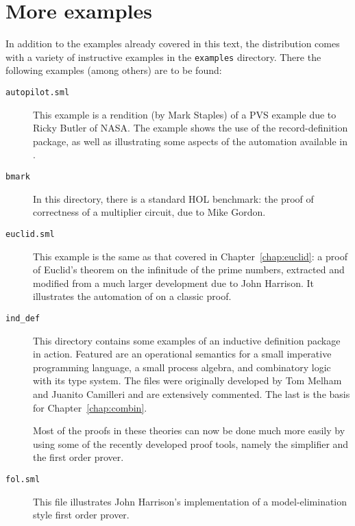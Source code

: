
\chapter{More examples}
\label{chap:more-examples}

In addition to the examples already covered in this text, the \holn{}
distribution comes with a variety of instructive examples in the
\verb|examples| directory.  There the following examples (among
others) are to be found:

\begin{description}

\item [\tt autopilot.sml]

  This example is a \holn{} rendition (by Mark Staples) of a PVS
  example due to Ricky Butler of NASA. The example shows the use of
  the record-definition package, as well as illustrating some aspects
  of the automation available in \holn{}.

\item [\tt bmark]

  In this directory, there is a standard HOL benchmark: the proof of
  correctness of a multiplier circuit, due to Mike Gordon.

\item [\tt euclid.sml]

  This example is the same as that covered in
  Chapter~\ref{chap:euclid}: a proof of Euclid's theorem on the
  infinitude of the prime numbers, extracted and modified from a much
  larger development due to John Harrison. It illustrates the
  automation of \HOL{} on a classic proof.

\item[\tt ind\_def]

This directory contains some examples of an inductive definition package
in action. Featured are an operational semantics for a small imperative
programming language, a small process algebra, and combinatory logic
with its type system. The files were originally developed by Tom Melham
and Juanito Camilleri and are extensively commented.  The last is the
basis for Chapter~\ref{chap:combin}.

Most of the proofs in these theories can now be done much more easily by
using some of the recently developed proof tools, namely the simplifier
and the first order prover.

\item [\tt fol.sml]

  This file illustrates John Harrison's implementation of a
  model-elimination style first order prover.


\end{description}

